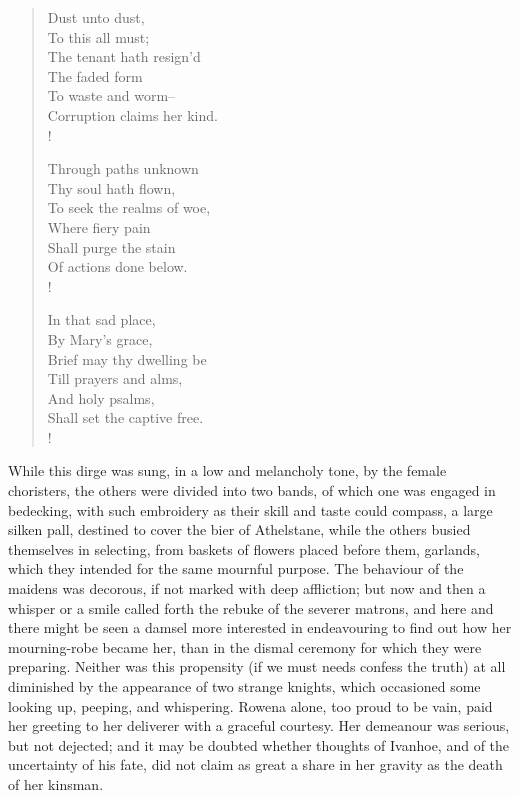 \begin{verse}
Dust unto dust,\\
To this all must;\\
The tenant hath resign'd\\
The faded form\\
To waste and worm--\\
Corruption claims her kind.\\!

Through paths unknown\\
Thy soul hath flown,\\
To seek the realms of woe,\\
Where fiery pain\\
Shall purge the stain\\
Of actions done below.\\!

In that sad place,\\
By Mary's grace,\\
Brief may thy dwelling be\\
Till prayers and alms,\\
And holy psalms,\\
Shall set the captive free.\\!
\end{verse}

While this dirge was sung, in a low and melancholy tone, by the female
choristers, the others were divided into two bands, of which one was
engaged in bedecking, with such embroidery as their skill and taste
could compass, a large silken pall, destined to cover the bier of
Athelstane, while the others busied themselves in selecting, from
baskets of flowers placed before them, garlands, which they intended for
the same mournful purpose. The behaviour of the maidens was decorous, if
not marked with deep affliction; but now and then a whisper or a smile
called forth the rebuke of the severer matrons, and here and there might
be seen a damsel more interested in endeavouring to find out how her
mourning-robe became her, than in the dismal ceremony for which they
were preparing. Neither was this propensity (if we must needs confess
the truth) at all diminished by the appearance of two strange knights,
which occasioned some looking up, peeping, and whispering. Rowena alone,
too proud to be vain, paid her greeting to her deliverer with a graceful
courtesy. Her demeanour was serious, but not dejected; and it may be
doubted whether thoughts of Ivanhoe, and of the uncertainty of his fate,
did not claim as great a share in her gravity as the death of her
kinsman.

